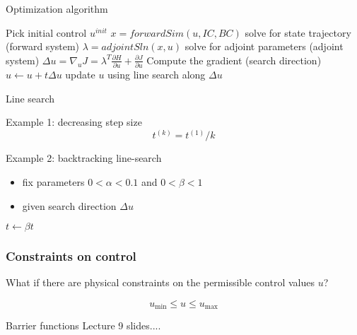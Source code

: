 \begin{frame}{Optimization algorithm}

\begin{algorithm}[H]

\begin{spacing}{1.3}
\begin{algorithmic}
\State Pick initial control $u^{init}$
\State $x = forwardSim(u,IC, BC)$ \hfill solve for state trajectory (forward system)
\State $\lambda = adjointSln(x,u)$ \hfill solve for adjoint parameters (adjoint system)
\State $\Delta u = \nabla_u J = \lambda^T \frac{\partial H}{\partial u} + \frac{\partial J}{\partial u}$ \hfill Compute the gradient (search direction)
\State $ u \gets u + t \Delta u $ \hfill update $u$ using line search along $\Delta u$
\EndWhile
\end{algorithmic}
\end{spacing}

\caption{Gradient descent loop}
\end{algorithm}

\end{frame}


\begin{frame}{Line search}

Example 1: decreasing step size
\[
t^{(k)} = t^{(1)} /k 
\]


Example 2: backtracking line-search
\begin{itemize}
\item fix parameters $ 0 < \alpha < 0.1$ and $0 < \beta < 1$
\item given search direction $\Delta u$
\end{itemize}

\begin{algorithm}[H]
\begin{algorithmic}
\State $t \gets \beta t$
\EndWhile
\end{algorithmic}
\caption{Backtracking line search}
\end{algorithm}

\end{frame}


\begin{frame}[t]\frametitle{Constraints on control}

What if there are physical constraints on the permissible control values $u$?

\begin{equation}
    u_{\min} \le u \le u_{\max}
\end{equation}
    
\begin{block}{Barrier functions}
Lecture 9 slides....
\end{block}


\end{frame}

